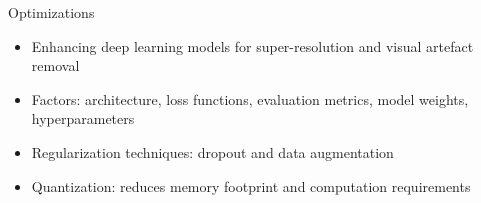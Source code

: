 \documentclass{beamer}
\begin{document}
\begin{frame}{Optimizations}
\begin{itemize}
  \item Enhancing deep learning models for super-resolution and visual artefact removal
  \item Factors: architecture, loss functions, evaluation metrics, model weights, hyperparameters
  \item Regularization techniques: dropout and data augmentation
  \item Quantization: reduces memory footprint and computation requirements
\end{itemize}
\end{frame}
\end{document}
